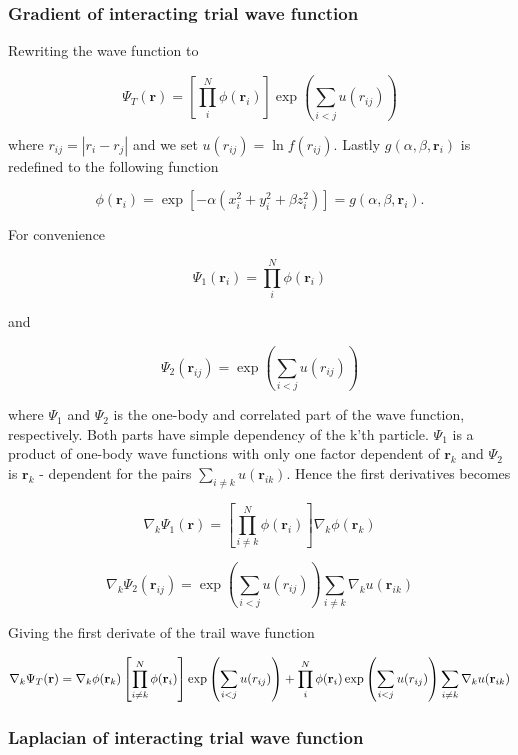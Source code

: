 \documentclass[
]{article}
\begin{document}
\hypertarget{sec:trial_wf_gradient}{%
\subsubsection{Gradient of interacting trial wave
function}\label{sec:trial_wf_gradient}}

Rewriting the wave function to

\[
\Psi_T(\mathbf{r})=\left[
    \prod_i^N \phi(\mathbf{r}_i)
\right]
\exp{\left(\sum_{i<j}u(r_{ij})\right)}
\]

where \(r_{ij} = |r_i - r_j|\) and we set \(u(r_{ij}) = \ln f(r_{ij})\).
Lastly \(g(\alpha, \beta,\mathbf{r}_i)\) is redefined to the following
function

\[
\phi(\mathbf{r}_i) = \exp [-\alpha(x_i^2 + y_i^2 + \beta z_i^2)] = g(\alpha, \beta,\mathbf{r}_i).
\]

For convenience

\[ \Psi_1 (\mathbf{r}_{i})= \prod_i^N \phi(\mathbf{r}_i)\]

and

\[\Psi_2 (\mathbf{r}_ {ij}) = \exp{\left(\sum_{i<j}u(r_{ij})\right)}\]

where \(\Psi_1\) and \(\Psi_2\) is the one-body and correlated part of
the wave function, respectively. Both parts have simple dependency of
the k'th particle. \(\Psi_1\) is a product of one-body wave functions
with only one factor dependent of \(\mathbf{r}_k\) and \(\Psi_2\) is
\(\mathbf{r}_k\) - dependent for the pairs
\(\sum _{i\ne k} u(\mathbf{r} _{ik})\). Hence the first derivatives
becomes

\[
\nabla_k \Psi_1(\mathbf{r}) = \left[\prod_ {i\ne k}^N \phi(\mathbf{r}_i) \right] \nabla_k \phi(\mathbf{r}_k)
\]

\[
\nabla_k \Psi_2(\mathbf{r}_ {ij}) = \exp {\left (\sum_ {i<j}u(r_{ij})\right)}  \sum_ {i \ne k} \nabla_k  u(\mathbf{r}_{ik})
\]

Giving the first derivate of the trail wave function

\[
\nabla_k \Psi_T(\mathbf{r}) = \nabla_k \phi(\mathbf{r}_ k) \left [\prod_ {i\ne k}^N \phi(\mathbf{r}_ i) \right] \exp {\left (\sum_ {i<j}u(r_{ij})\right)} \\ +
 \prod_i^N \phi (\mathbf{r}_ i) \exp{ \left( \sum_{i<j} u(r_{ij}) \right)}  \sum_ {i \ne k} \nabla_k  u(\mathbf{r}_{ik})
\]

\hypertarget{sec:trial_wf_laplacian}{%
\subsubsection{Laplacian of interacting trial wave
function}\label{sec:trial_wf_laplacian}}
\end{document}
